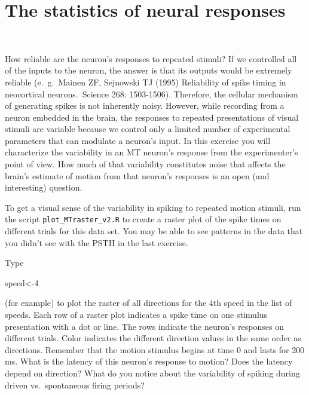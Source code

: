 \documentclass[
letterpaper, %
11pt, %
 oneside, 
onecolumn, %
]{memoir}
\numberwithin{Exercise}{chapter}
\begin{document}
\chapter{The statistics of neural responses}~

How reliable are the neuron's responses to repeated stimuli?  If we controlled all of the inputs to the neuron, the answer is that its outputs would be extremely reliable (e.\ g.\ Mainen ZF, Sejnowski TJ (1995) Reliability of spike timing in neocortical neurons.\  Science 268: 1503-1506).  Therefore, the cellular mechanism of generating spikes is not inherently noisy.  However, while recording from a neuron embedded in the brain, the responses to repeated presentations of visual stimuli are variable because we control only a limited number of experimental parameters that can modulate a neuron's input.   In this exercise you will characterize the variability in an MT neuron's response from the experimenter's point of view.  How much of that variability constitutes noise that affects the brain's estimate of motion from that neuron's responses is an open (and interesting) question.    

To get a visual sense of the variability in spiking to repeated motion stimuli, run the script \verb+plot_MTraster_v2.R+ to create a raster plot of the spike times on different trials for this data set.   You may be able to see patterns in the data that you didn't see with the PSTH in the last exercise. 

Type \begin{shortrcode}
speed<-4
\end{shortrcode} (for example) to plot the raster of all directions for the 4th speed in the list of speeds. Each row of a raster plot indicates a spike time on one stimulus presentation with a dot or line.  The rows indicate the neuron's responses on different trials.   Color indicates the different direction values in the same order as directions.  Remember that the motion stimulus begins at time 0 and lasts for 200 ms.   What is the latency of this neuron's response to motion?  Does the latency depend on direction?  What do you notice about the variability of spiking during driven vs.\ spontaneous firing periods?
\end{document}
